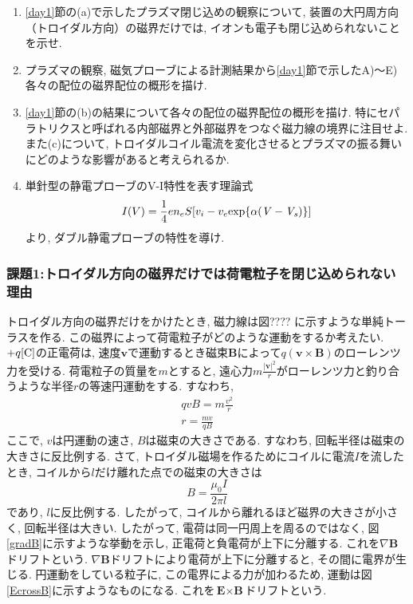 \documentclass[]{jsarticle}
\begin{document}
	\begin{enumerate}
	\item \ref{day1}節の(a)で示したプラズマ閉じ込めの観察について, 装置の大円周方向（トロイダル方向）の磁界だけでは, イオンも電子も閉じ込められないことを示せ. 
	\item プラズマの観察, 磁気プローブによる計測結果から\ref{day1}節で示したA)〜E)各々の配位の磁界配位の概形を描け. 
	\item \ref{day1}節の(b)の結果について各々の配位の磁界配位の概形を描け. 特にセパラトリクスと呼ばれる内部磁界と外部磁界をつなぐ磁力線の境界に注目せよ. また(c)について, トロイダルコイル電流を変化させるとプラズマの振る舞いにどのような影響があると考えられるか. 
	\item 単針型の静電プローブのV-I特性を表す理論式
	\begin{eqnarray}
		\label{vitheory}
		I(V) = \frac{1}{4} en_e S[v_i - v_e \rm{exp}\{\it{\alpha(V - V_s)}\}] 
	\end{eqnarray}
	より, ダブル静電プローブの特性を導け. 
	\end{enumerate}
		\subsubsection{課題1:トロイダル方向の磁界だけでは荷電粒子を閉じ込められない理由}
		トロイダル方向の磁界だけをかけたとき, 磁力線は図????%
		に示すような単純トーラスを作る. この磁界によって荷電粒子がどのような運動をするか考えたい. 
		$+q[\rm{C}]$の正電荷は, 速度$\textbf{v}$で運動するとき磁束$\textbf{B}$によって$q(\textbf{v} \times \textbf{B})$のローレンツ力を受ける. 荷電粒子の質量を$m$とすると, 遠心力$m\frac{|\textbf{v}|^2}{r}$がローレンツ力と釣り合うような半径$r$の等速円運動をする. すなわち, 
		\begin{eqnarray*}
			qvB = m\frac{v^2}{r}\\
			r = \frac{mv}{qB}
		\end{eqnarray*}
		ここで, $v$は円運動の速さ, $B$は磁束の大きさである. すなわち, 回転半径は磁束の大きさに反比例する. 
		さて, トロイダル磁場を作るためにコイルに電流$I$を流したとき, コイルから$l$だけ離れた点での磁束の大きさは$$B = \frac{\mu_0 I}{2\pi l}$$であり, $l$に反比例する. したがって, コイルから離れるほど磁界の大きさが小さく, 回転半径は大きい. したがって, 電荷は同一円周上を周るのではなく, 図\ref{gradB}に示すような挙動を示し, 正電荷と負電荷が上下に分離する. これを$\nabla \textbf{B}$ドリフトという. 
		$\nabla \textbf{B}$ドリフトにより電荷が上下に分離すると, その間に電界が生じる. 円運動をしている粒子に, この電界による力が加わるため, 運動は図\ref{EcrossB}に示すようなものになる. これを$\textbf{E} \times \textbf{B}$ドリフトという. 
		
\end{document}
